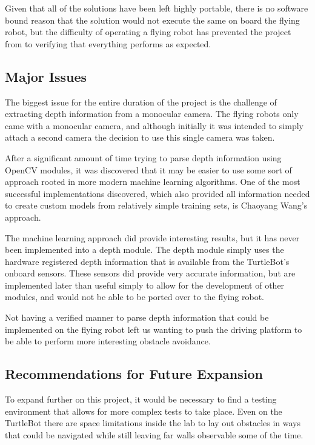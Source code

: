 \documentclass{article}[12]
\begin{document}
Given that all of the solutions have been left highly portable, there is no software bound reason that the solution would not execute the same on board the flying robot, but the difficulty of operating a flying robot has prevented the project from to verifying that everything performs as expected.

\subsection{Major Issues}

The biggest issue for the entire duration of the project is the challenge of extracting depth information from a monocular camera. The flying robots only came with a monocular camera, and although initially it was intended to simply attach a second camera the decision to use this single camera was taken.

After a significant amount of time trying to parse depth information using OpenCV modules, it was discovered that it may be easier to use some sort of approach rooted in more modern machine learning algorithms. One of the most successful implementations discovered, which also provided all information needed to create custom models from relatively simple training sets, is Chaoyang Wang's approach.\cite{Wang_2018_CVPR} 

The machine learning approach did provide interesting results, but it has never been implemented into a depth module. The depth module simply uses the hardware registered depth information that is available from the TurtleBot's onboard sensors. These sensors did provide very accurate information, but are implemented later than useful simply to allow for the development of other modules, and would not be able to be ported over to the flying robot. 

Not having a verified manner to parse depth information that could be implemented on the flying robot left us wanting to push the driving platform to be able to perform more interesting obstacle avoidance.

\subsection{Recommendations for Future Expansion}

To expand further on this project, it would be necessary to find a testing environment that allows for more complex tests to take place. Even on the TurtleBot there are space limitations inside the lab to lay out obstacles in ways that could be navigated while still leaving far walls observable some of the time. 
\end{document}
